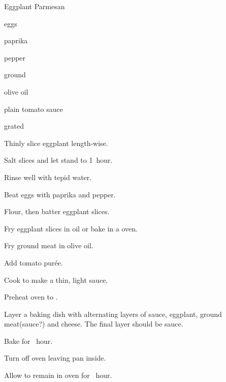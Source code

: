 \begin{recipe}{Eggplant Parmesan\FIXME}{}{}

\begin{ingredients}
\item {}
\item eggs
\item paprika
\item pepper
\item ground 
\item olive oil
\item plain tomato sauce
\item grated 
\end{ingredients}

\begin{directions}
\item Thinly slice eggplant length-wise.
\item Salt slices and let stand \half{} to 1~hour.
\item Rinse well with tepid water.
\item Beat eggs with paprika and pepper.
\item Flour, then batter eggplant slices.
\item Fry eggplant slices in oil or bake in a  oven.
\item Fry ground meat in olive oil.
\item Add tomato pur\'ee.
\item Cook to make a thin, light sauce.
\item Preheat oven to .
\item Layer a baking dish with alternating layers of sauce, eggplant, ground meat(sauce?) and cheese. The final layer should be sauce.
\item Bake for \half~hour.
\item Turn off oven leaving pan inside.
\item Allow to remain in oven for \half~hour.
\end{directions}

\end{recipe}
